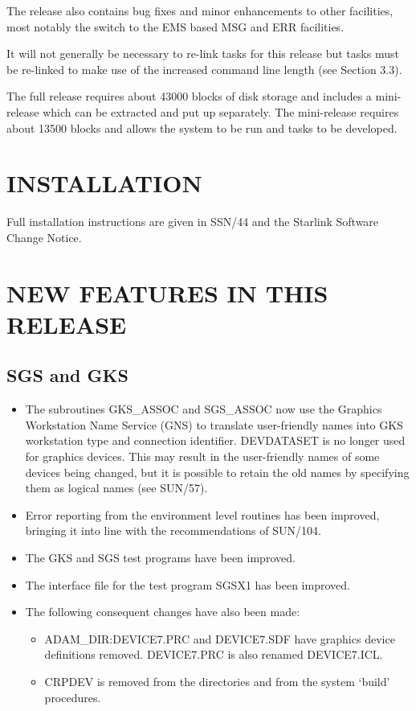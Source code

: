 The release also contains bug fixes and minor enhancements to other facilities,
most notably the switch to the EMS based MSG and ERR facilities.

It will not generally be necessary to re-link tasks for this release but tasks
must be re-linked to make use of the increased command line length (see
Section 3.3).

The full release requires about 43000 blocks of disk storage and includes a
mini-release which can be extracted and put up separately.
The mini-release requires about 13500 blocks and allows the system to be run
and tasks to be developed.

\section{INSTALLATION}
Full installation instructions are given in SSN/44 and the Starlink Software
Change Notice.

\section{NEW FEATURES IN THIS RELEASE}

\subsection{SGS and GKS}
\begin{itemize}
\item The subroutines GKS\_ASSOC and SGS\_ASSOC now use the Graphics
Workstation Name Service (GNS) to translate user-friendly names into GKS
workstation type and connection identifier.
DEVDATASET is no longer used for graphics devices.
This may result in the user-friendly names of some devices being changed, but
it is possible to retain the old names by specifying them as logical
names (see SUN/57).
\item Error reporting from the environment level routines has been improved,
bringing it into line with the recommendations of SUN/104.
\item The GKS and SGS test programs have been improved.
\item The interface file for the test program SGSX1 has been improved.
\item The following consequent changes have also been made:
\begin{itemize}
\item ADAM\_DIR:DEVICE7.PRC and DEVICE7.SDF have graphics device definitions
removed.
DEVICE7.PRC is also renamed DEVICE7.ICL.
\item CRPDEV is removed from the directories and from the system `build'
procedures.
\end{itemize}
\end{itemize}

